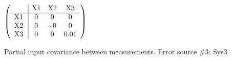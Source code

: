 \begin{table}[H]
\scriptsize
\begin{center}
\renewcommand{\arraystretch}{1.1}
\begin{math}\left(\begin{array}{c|ccc}
 & \mathrm{X1} & 
\mathrm{X2} & 
\mathrm{X3} \\
\hline
\mathrm{X1} \hspace*{2pt} &  0 &  0 &  0 \\
\mathrm{X2} \hspace*{2pt} &  0 &  {\scriptstyle \sim }0 &  0 \\
\mathrm{X3} \hspace*{2pt} &  0 &  0 &       0.01 \\
\end{array}\right)\end{math}
\caption{Partial input covariance between measurements. Error source \#3: Sys3.}
\renewcommand{\arraystretch}{1}
\end{center}
\end{table}
